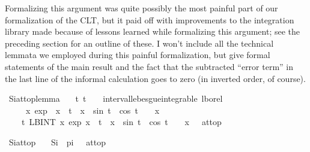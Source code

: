 \documentclass{article}
\theoremstyle{definition}
\begin{document}
Formalizing this argument was quite possibly the most painful part of our formalization of the CLT, but it paid off with improvements to the integration library made because of lessons learned while formalizing this argument; see the preceding section for an outline of these. I won't include all the technical lemmata we employed during this painful formalization, but give formal statements of the main result and the fact that the subtracted ``error term'' in the last line of the informal calculation goes to zero (in inverted order, of course).\phantom{)}

\medskip

\begin{isabellebody}
\isamarkupfalse%
\ Si{\isacharunderscore}at{\isacharunderscore}top{\isacharunderscore}lemma{\isacharcolon}\isanewline
\ \ \ {\isachardoublequoteopen}{\isasymAnd}t{\isachardot}\ t\ {\isasymge}\ {}\ {\isasymLongrightarrow}\ interval{\isacharunderscore}lebesgue{\isacharunderscore}integrable\ lborel\ {}\ {\isasyminfinity}\isanewline
\ \ \ \ \ {\isacharparenleft}{\isasymlambda}x{\isachardot}\ exp\ {\isacharparenleft}{\isacharminus}\ {\isacharparenleft}x\ {\isacharasterisk}\ t{\isacharparenright}{\isacharparenright}\ {\isacharasterisk}\ {\isacharparenleft}x\ {\isacharasterisk}\ sin\ t\ {\isacharplus}\ cos\ t{\isacharparenright}\ {\isacharslash}\ {\isacharparenleft}{}\ {\isacharplus}\ x\isanewline
\ \ \isanewline
\ \ \ \ {\isachardoublequoteopen}{\isacharparenleft}{\isacharparenleft}{\isasymlambda}t{\isachardot}\ {\isacharparenleft}LBINT\ x{\isacharequal}{}{\isachardot}{\isachardot}{\isasyminfinity}{\isachardot}\ exp\ {\isacharparenleft}{\isacharminus}{\isacharparenleft}x\ {\isacharasterisk}\ t{\isacharparenright}{\isacharparenright}\ {\isacharasterisk}\ {\isacharparenleft}x\ {\isacharasterisk}\ sin\ t\ {\isacharplus}\ cos\ t{\isacharparenright}\ {\isacharslash}\ {\isacharparenleft}{}\ {\isacharplus}\ x{\isacharcircum}{}{\isacharparenright}{\isacharparenright}{\isacharparenright}\ {\isacharminus}{\isacharminus}{\isacharminus}{\isachargreater}\ {}{\isacharparenright}\ at{\isacharunderscore}top{\isachardoublequoteclose}
\end{isabellebody}

\medskip

\begin{isabellebody}
\isamarkupfalse%
\ Si{\isacharunderscore}at{\isacharunderscore}top{\isacharcolon}\isanewline
\ \ \ {\isachardoublequoteopen}{\isacharparenleft}Si\ {\isacharminus}{\isacharminus}{\isacharminus}{\isachargreater}\ pi\ {\isacharslash}\ {}{\isacharparenright}\ at{\isacharunderscore}top{\isachardoublequoteclose}
\end{isabellebody}
\end{document}
